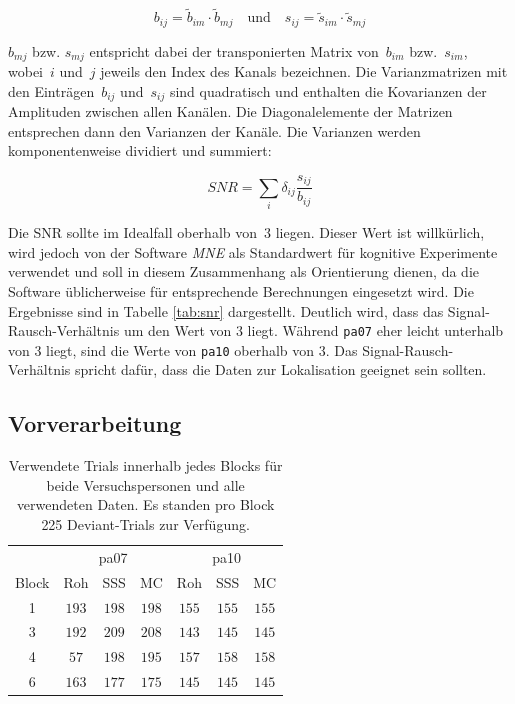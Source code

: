 \documentclass[doc,a4paper,12pt]{apa6}
\renewcommand{\arraystretch}{1.2}
\begin{document}
\begin{equation}
b_{ij} = \tilde{b}_{im} \cdot \tilde{b}_{mj} \quad \text{und} \quad s_{ij} = \tilde{s}_{im} \cdot \tilde{s}_{mj}
\end{equation}

$b_{mj}$ bzw. $s_{mj}$ entspricht dabei der transponierten Matrix von~$b_{im}$ bzw.~$s_{im}$, wobei~$i$ und~$j$ jeweils den Index des Kanals bezeichnen. Die Varianzmatrizen mit den Einträgen~$b_{ij}$ und~$s_{ij}$ sind quadratisch und enthalten die Kovarianzen der Amplituden zwischen allen Kanälen. Die Diagonalelemente der Matrizen entsprechen dann den Varianzen der Kanäle. Die Varianzen werden komponentenweise dividiert und summiert:

\begin{equation}
SNR = \sum_i \delta_{ij} \frac{s_{ij}}{b_{ij}}
\end{equation}

Die SNR sollte im Idealfall oberhalb von~$3$ liegen. Dieser Wert ist willkürlich, wird jedoch von der Software \emph{MNE} als Standardwert für kognitive Experimente verwendet und soll in diesem Zusammenhang als Orientierung dienen, da die Software üblicherweise für entsprechende Berechnungen eingesetzt wird. Die Ergebnisse sind in Tabelle \ref{tab:snr} dargestellt. Deutlich wird, dass das Signal-Rausch-Verhältnis um den Wert von $3$ liegt. Während \texttt{pa07} eher leicht unterhalb von $3$ liegt, sind die Werte von \texttt{pa10} oberhalb von $3$. Das Signal-Rausch-Verhältnis spricht dafür, dass die Daten zur Lokalisation geeignet sein sollten.

\subsection{Vorverarbeitung}
\label{sec:ergebnis-vorverarbeitung}

\begin{table}
  \caption{}
  \label{tab:rejecting}
  \vspace*{3mm}
  \centering
  \setlength{\tabcolsep}{7mm}
  \renewcommand{\arraystretch}{1.5}
  \begin{tabular}{ccccccc}
  \hline
  & \multicolumn{3}{c}{pa07} & \multicolumn{3}{c}{pa10}\\
  Block & Roh & SSS & MC & Roh & SSS & MC \\
  \hline
  1 & $193$ & $198$ & $198$ & $155$ & $155$ & $155$\\
  3 & $192$ & $209$ & $208$ & $143$ & $145$ & $145$\\
  4 & $57$ & $198$ & $195$ & $157$ & $158$ & $158$\\
  6 & $163$ & $177$ & $175$ & $145$ & $145$ & $145$\\
  \hline
  \end{tabular}
  \vspace*{3mm}
  \caption*{Verwendete Trials innerhalb jedes Blocks für beide Versuchspersonen und alle verwendeten Daten. Es standen pro Block 225 Deviant-Trials zur Verfügung.}
\end{table}
\end{document}
